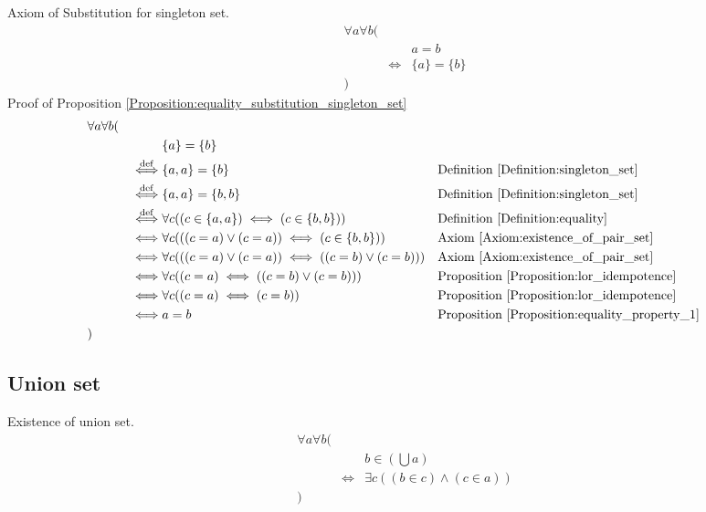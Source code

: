 \begin{prop}
\label{Proposition:equality_substitution_singleton_set}
Axiom of Substitution for singleton set.
\begin{align*}
& \forall a \forall b ( \\
& & & a = b \\
& & \iff & \{ a \} = \{ b \} \\
& )
\end{align*}
Proof of Proposition \ref{Proposition:equality_substitution_singleton_set}
\begin{align*}
& \forall a \forall b ( \\
& & & \{ a \} = \{ b \} \\
& & \overset{\operatorname{def}}{\iff} & \{ a , a \} = \{ b \}
& & \text{Definition \ref{Definition:singleton_set}} \\
& & \overset{\operatorname{def}}{\iff} & \{ a , a \} = \{ b , b \}
& & \text{Definition \ref{Definition:singleton_set}} \\
& & \overset{\operatorname{def}}{\iff} & \forall c ((c \in \{ a , a \}) \iff (c \in \{ b , b \}))
& & \text{Definition \ref{Definition:equality}} \\
& & \iff & \forall c (((c = a) \lor (c = a)) \iff (c \in \{ b , b \}))
& & \text{Axiom \ref{Axiom:existence_of_pair_set}} \\
& & \iff & \forall c (((c = a) \lor (c = a)) \iff ((c = b) \lor (c = b)))
& & \text{Axiom \ref{Axiom:existence_of_pair_set}} \\
& & \iff & \forall c ((c = a) \iff ((c = b) \lor (c = b)))
& & \text{Proposition \ref{Proposition:lor_idempotence}} \\
& & \iff & \forall c ((c = a) \iff (c = b))
& & \text{Proposition \ref{Proposition:lor_idempotence}} \\
& & \iff & a = b
& & \text{Proposition \ref{Proposition:equality_property_1}} \\
& )
\end{align*}
\end{prop}

\subsection{Union set}
\begin{axm}
\label{Axiom:existence_of_union_set}
Existence of union set.
\begin{align*}
& \forall a \forall b ( \\
& & & b \in (\bigcup a) \\
& & \iff & \exists c ((b \in c) \land (c \in a)) \\
& )
\end{align*}
\end{axm}

